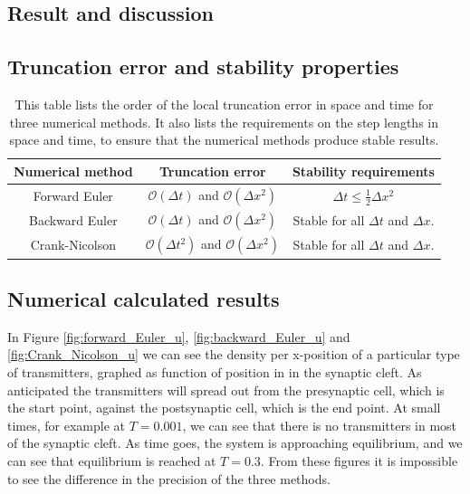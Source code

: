 \documentclass[12pt]{article}
\begin{document}
\begin{flushleft}
\newpage
\section{Result and discussion}
\subsection{Truncation error and stability properties}

\begin{table}[!h]
\begin{center}
\begin{tabular}{| c | c | c |}
	\hline
	\textbf{Numerical method} & \textbf{Truncation error} & \textbf{Stability requirements}\\
	\hline	
	Forward Euler & $\mathcal{O}(\Delta t)$ and $\mathcal{O}(\Delta x^2)$ & $\Delta t \leq \frac{1}{2}\Delta x^2$ \\
		Backward Euler & $\mathcal{O}(\Delta t)$ and $\mathcal{O}(\Delta x^2)$ & Stable for all $\Delta t$ and $\Delta x$.\\
			Crank-Nicolson & $\mathcal{O}(\Delta t^2)$ and $\mathcal{O}(\Delta x^2)$ & Stable for all $\Delta t$ and $\Delta x$.\\
  \hline
\end{tabular}
\end{center}
\caption{\label{tab:error_stability}This table lists the order of the local truncation error in space and time for three numerical methods. It also lists the requirements on the step lengths in space and time, to ensure that the numerical methods produce stable results.}
\end{table}

\subsection{Numerical calculated results}
In Figure \ref{fig:forward_Euler_u}, \ref{fig:backward_Euler_u} and \ref{fig:Crank_Nicolson_u} we can see the density per x-position of a particular type of transmitters, graphed as function of position in in the synaptic cleft. As anticipated the transmitters will spread out from the presynaptic cell, which is the start point, against the postsynaptic cell, which is the end point. At small times, for example at $T = 0.001$, we can see that there is no transmitters in most of the synaptic cleft. As time goes, the system is approaching equilibrium, and we can see that equilibrium is reached at $T = 0.3$. From these figures it is impossible to see the difference in the precision of the three methods.



\end{flushleft}
\end{document}
